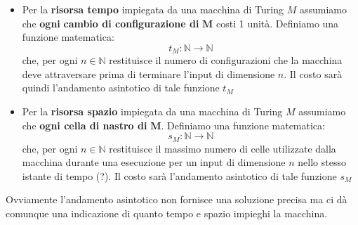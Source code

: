 \begin{itemize}
    \item Per la \textbf{risorsa tempo} impiegata da una macchina di Turing $M$ assumiamo che \textbf{ogni} \textbf{cambio di configurazione di } $\bm{M}$
    costi 1 unità. Definiamo una funzione matematica:
    \[    t_M : \mathbb{N} \to \mathbb{N}   \]
    che, per ogni $n \in \mathbb{N}$ restituisce il numero di configurazioni che la macchina deve attraversare prima 
    di terminare l'input di dimensione $n$. Il costo sarà quindi l'andamento asintotico di tale funzione $t_M$
    
    \item Per la \textbf{risorsa spazio} impiegata da una macchina di Turing $M$ assumiamo che \textbf{ogni cella di nastro di} $\bm{M}$.
    Definiamo una funzione matematica:
    \[  s_M : \mathbb{N} \to \mathbb{N}   \]
    che, per ogni $n \in \mathbb{N}$ restituisce il massimo numero di celle utilizzate dalla macchina durante una esecuzione per un input di dimensione $n$
    nello stesso istante di tempo (?). Il costo sarà l'andamento asintotico di tale funzione $s_M$ 
\end{itemize} 
Ovviamente l'andamento asintotico non fornisce una soluzione precisa ma ci dà comunque una indicazione di quanto tempo e spazio impieghi la macchina.
\newpage

